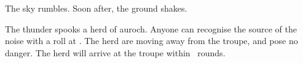\begin{boxtext}
  The sky rumbles.
  Soon after, the ground shakes.
\end{boxtext}

\auroch

The thunder spooks a herd of auroch.
Anyone can recognise the source of the noise with a  roll at \tn[6].
\ifodd\thefenestraDay
  The herd are moving away from the troupe, and pose no danger.
\else%
  The herd will arrive at the troupe within ~\glspl{round}.
\fi%

